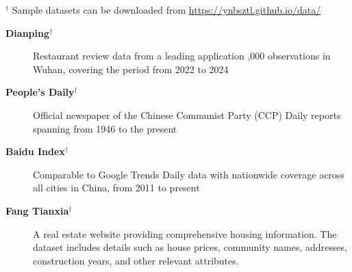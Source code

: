 
$^\dagger$ Sample datasets can be downloaded from \href{https://ynbsztl.github.io/data/}{https://ynbsztl.github.io/data/}

\begin{description}
\item[\textbf{Dianping}$^\dagger$] Restaurant review data from a leading application
,000 observations in Wuhan, covering the period from 2022 to 2024
\item[\textbf{People’s Daily}$^\dagger$] Official newspaper of the Chinese Communist Party (CCP)
\subitem Daily reports spanning from 1946 to the present
\item[\textbf{Baidu Index}$^\dagger$] Comparable to Google Trends
\subitem Daily data with nationwide coverage across all cities in China, from 2011 to present
\item[\textbf{Fang Tianxia}$^\dagger$] A real estate website providing comprehensive housing information.
\subitem The dataset includes details such as house prices, community names, addresses, construction years, and other relevant attributes.
\end{description}